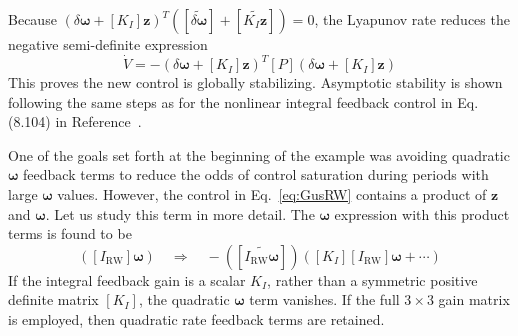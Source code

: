 \documentclass[]{BasiliskReportMemo}
\begin{document}
		Because $(\delta\bm\omega + [K_{I}]\bm z )^{T}  ([\widetilde{\delta\bm\omega}] + [\widetilde{K_{I}\bm z}] ) = 0$, the Lyapunov rate reduces the negative semi-definite expression
		\begin{equation*}
			\dot V = -  (\delta\bm\omega + [K_{I}]\bm z )^{T} [P]  (\delta\bm\omega + [K_{I}]\bm z )
		\end{equation*}
		This proves the new control is globally stabilizing.  Asymptotic stability is shown following the same steps as for the  nonlinear integral feedback control in Eq. (8.104) in Reference~.  
		
		One of the goals set forth at the beginning of the example was avoiding quadratic $\bm\omega$ feedback terms to reduce the odds of control saturation during periods with large $\bm\omega$ values.  However, the control in Eq.~\eqref{eq:GusRW} contains a product of $\bm z$ and $\bm\omega$.  Let us study this term in more detail.  The $\bm\omega$ expression with this product terms is found to be
		\begin{equation*}
			[\widetilde{K_{I}\bm z}] ([I_{\text{RW}}]\bm \omega)
			 \quad \Rightarrow \quad 
			-  (
			[\widetilde{I_{\text{RW}} \bm \omega}] 
			 ) ([K_{I}] [I_{\text{RW}}] \bm \omega + \cdots )
		\end{equation*}
		If the integral feedback gain is a scalar $K_{I}$, rather than a symmetric positive definite matrix $[K_{I}]$, the quadratic $\bm\omega$ term vanishes.  If the full $3\times 3$ gain matrix is employed, then quadratic rate feedback terms are retained.  



\end{document}
